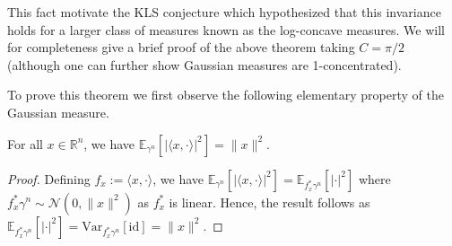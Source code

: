 This fact motivate the KLS conjecture which hypothesized that 
this invariance holds for a larger class of measures known as the log-concave measures. We will 
for completeness give a brief proof of the above theorem taking \(C = \pi / 2\) 
(although one can further show Gaussian measures are 1-concentrated).

To prove this theorem we first observe the following elementary property of the Gaussian measure.

\begin{lemma}\label{lem:gaussian_inner}
  For all \(x \in \mathbb{R}^n\), we have 
  \(\mathbb{E}_{\gamma^n}[|\langle x, \cdot \rangle|^2] = \|x\|^2\).
\end{lemma}
\begin{proof}
  Defining \(f_x := \langle x, \cdot \rangle\), we have 
  \(\mathbb{E}_{\gamma^n}[|\langle x, \cdot \rangle|^2] = \mathbb{E}_{f_x^* \gamma^n}[|\cdot |^2]\) where 
  \(f_x^* \gamma^n \sim \mathcal{N}(0, \|x\|^2)\) as \(f_x^*\) is linear. Hence, the result follows as 
  \(\mathbb{E}_{f_x^* \gamma^n}[|\cdot |^2] = \text{Var}_{f_x^* \gamma^n}[\text{id}] = \|x\|^2\).
\end{proof}

